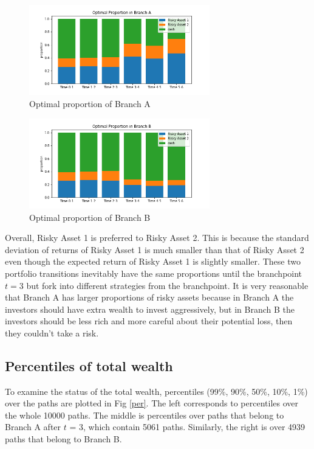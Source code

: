 \documentclass[11t]{article}
\begin{document}
\begin{figure}[htbp]
\centering
\includegraphics[width=0.7\textwidth]{optimal_proportion_A.png}
\caption{Optimal proportion of Branch A}
\label{branch_A}
\end{figure}
\begin{figure}[htbp]
\centering
\includegraphics[width=0.7\textwidth]{optimal_proportion_B.png}
\caption{Optimal proportion of Branch B}
\label{branch_B}
\end{figure}

Overall, Risky Asset 1 is preferred to Risky Asset 2. This is because the standard deviation of returns of Risky Asset 1 is much smaller than that of Risky Asset 2 even though the expected return of Risky Asset 1 is slightly smaller.  These two portfolio transitions inevitably have the same proportions until the branchpoint $t=3$ but fork into different strategies from the branchpoint. It is very reasonable that Branch A has larger proportions of risky assets because in Branch A the investors should have extra wealth to invest aggressively, but in Branch B the investors should be less rich and more careful about their potential loss, then they couldn't take a risk. 

\subsection{Percentiles of total wealth}
To examine the status of the total wealth, percentiles (99\%, 90\%, 50\%, 10\%, 1\%) over the paths are plotted in Fig \ref{per}.
The left corresponds to percentiles over the whole 10000 paths.
The middle is percentiles over paths that belong to Branch A after $t$ = 3, which contain 5061 paths.
Similarly, the right is over 4939 paths that belong to Branch B.
\end{document}
